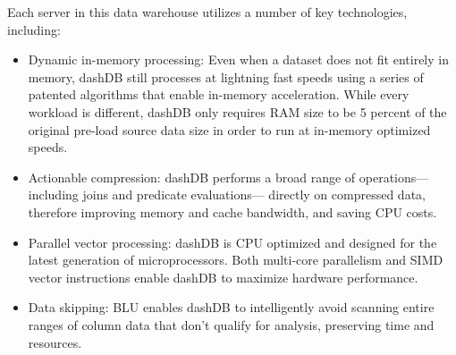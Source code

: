 \documentclass[letterpaper, 12pt]{article}
\renewcommand{\includegraphics}[2][]{\fbox{}}
\begin{document}
\begin{itemize}
	  \par\vspace{\baselineskip}
	  \cite{dashDB}
	  \par\vspace{\baselineskip}
	  Each server in this data warehouse utilizes a number of key technologies, including: 
	  \begin{itemize}
	    \item Dynamic in-memory processing: Even when a dataset
	    does not fit entirely in memory, dashDB still processes at
	    lightning fast speeds using a series of patented algorithms
	    that enable in-memory acceleration. While every workload
	    is different, dashDB only requires RAM size to be 5 percent
	    of the original pre-load source data size in order to run at
        in-memory optimized speeds.
        \item Actionable compression: dashDB performs a broad range
	    of operations—including joins and predicate evaluations—
	    directly on compressed data, therefore improving memory
	    and cache bandwidth, and saving CPU costs.
   	   \item Parallel vector processing: dashDB is CPU optimized
	   and designed for the latest generation of microprocessors.
	   Both multi-core parallelism and SIMD vector instructions
       enable dashDB to maximize hardware performance.
	   \item Data skipping: BLU enables dashDB to intelligently avoid
	   scanning entire ranges of column data that don’t qualify for
	   analysis, preserving time and resources.
	 \end{itemize}
	

\end{itemize}
\end{document}
